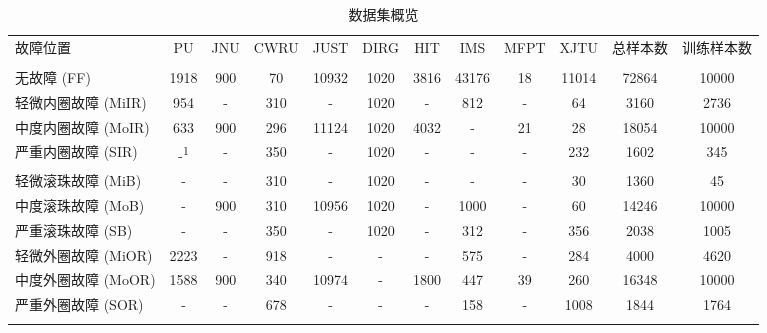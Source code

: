 \documentclass[UTF8,lettersize,journal]{IEEEtran}
\begin{document}
\setlength{\tabcolsep}{5pt}
\begin{table}[!htbp]
	\footnotesize
	\caption{数据集概览}
	\centering
	\label{tab:Detailed datasets} %
	\begin{tabular}{lccccccccccc} %
		\toprule[1pt]\noalign{\smallskip}
		故障位置 & PU & JNU & CWRU & JUST & DIRG & HIT & IMS & MFPT & XJTU &总样本数& 训练样本数\\
		& \cite{PU} & \cite{s130608013} & \cite{15467457} & \cite{JUST} & \cite{DAGA2019252} & \cite{HIT} & \cite{IMS} & \cite{MFPT} & \cite{XJTU} &&\\
		\noalign{\smallskip}\hline\noalign{\smallskip}
		无故障 (FF)& 1918 & 900 & 70 & 10932 & 1020 & 3816 & 43176 & 18 & 11014 & 72864 & 10000\\
		\noalign{\smallskip}\hline\noalign{\smallskip}
		轻微内圈故障 (MiIR)& 954 & - & 310 & - & 1020 & - & 812 & - & 64 & 3160 &2736\\
		\noalign{\smallskip}\hline\noalign{\smallskip}
		中度内圈故障 (MoIR)& 633 & 900 & 296 & 11124 & 1020 & 4032 & - & 21 & 28 & 18054 &10000\\
		\noalign{\smallskip}\hline\noalign{\smallskip}
		严重内圈故障 (SIR)& -\textsuperscript{1} & - & 350 & - & 1020 & - & - & - & 232 & 1602 &345\\
		\noalign{\smallskip}\hline\noalign{\smallskip}
		轻微滚珠故障 (MiB)& - & - & 310 & - & 1020 & - & - & - & 30 & 1360 &45\\
		\noalign{\smallskip}\hline\noalign{\smallskip}
		中度滚珠故障 (MoB)& - & 900 & 310 & 10956 & 1020 & - & 1000 & - & 60 & 14246 &10000\\
		\noalign{\smallskip}\hline\noalign{\smallskip}
		严重滚珠故障 (SB)& - & - & 350 & - & 1020 & - & 312 & - & 356 & 2038 &1005\\
		\noalign{\smallskip}\hline\noalign{\smallskip}
		轻微外圈故障 (MiOR)& 2223 & - & 918 & - & - & - & 575 & - & 284 & 4000 & 4620 \\
		\noalign{\smallskip}\hline\noalign{\smallskip}
		中度外圈故障 (MoOR)& 1588 & 900 & 340 & 10974 & - & 1800 & 447 & 39 & 260 & 16348 &10000\\
		\noalign{\smallskip}\hline\noalign{\smallskip}
		严重外圈故障 (SOR)& - & - & 678 & - & - & - & 158 & - & 1008 & 1844 &1764\\
		\noalign{}\bottomrule[1pt]
		\multicolumn{10}{l}{\textsuperscript{1} 破折号(–)表示该数据集中不存在相应的故障位置类别。}\\[-5pt]
	\end{tabular}
\end{table}
\end{document}
